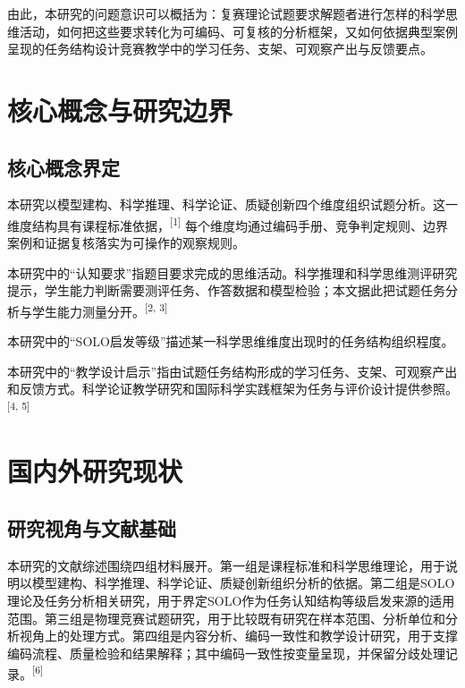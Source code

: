 \documentclass[
  12pt,
  a4paper,twoside,openany]{ctexbook}
\begin{document}
由此，本研究的问题意识可以概括为：复赛理论试题要求解题者进行怎样的科学思维活动，如何把这些要求转化为可编码、可复核的分析框架，又如何依据典型案例呈现的任务结构设计竞赛教学中的学习任务、支架、可观察产出与反馈要点。

\section{核心概念与研究边界}\label{ux6838ux5fc3ux6982ux5ff5ux4e0eux7814ux7a76ux8fb9ux754c}

\subsection{核心概念界定}\label{ux6838ux5fc3ux6982ux5ff5ux754cux5b9a}

本研究以模型建构、科学推理、科学论证、质疑创新四个维度组织试题分析。这一维度结构具有课程标准依据，\textsuperscript{[1]}
每个维度均通过编码手册、竞争判定规则、边界案例和证据复核落实为可操作的观察规则。

本研究中的``认知要求''指题目要求完成的思维活动。科学推理和科学思维测评研究提示，学生能力判断需要测评任务、作答数据和模型检验；本文据此把试题任务分析与学生能力测量分开。\textsuperscript{[2, 3]}

本研究中的``SOLO启发等级''描述某一科学思维维度出现时的任务结构组织程度。

本研究中的``教学设计启示''指由试题任务结构形成的学习任务、支架、可观察产出和反馈方式。科学论证教学研究和国际科学实践框架为任务与评价设计提供参照。\textsuperscript{[4, 5]}

\section{国内外研究现状}\label{ux56fdux5185ux5916ux7814ux7a76ux73b0ux72b6}

\subsection{研究视角与文献基础}\label{ux7814ux7a76ux89c6ux89d2ux4e0eux6587ux732eux57faux7840}

本研究的文献综述围绕四组材料展开。第一组是课程标准和科学思维理论，用于说明以模型建构、科学推理、科学论证、质疑创新组织分析的依据。第二组是SOLO理论及任务分析相关研究，用于界定SOLO作为任务认知结构等级启发来源的适用范围。第三组是物理竞赛试题研究，用于比较既有研究在样本范围、分析单位和分析视角上的处理方式。第四组是内容分析、编码一致性和教学设计研究，用于支撑编码流程、质量检验和结果解释；其中编码一致性按变量呈现，并保留分歧处理记录。\textsuperscript{[6]}
\end{document}

